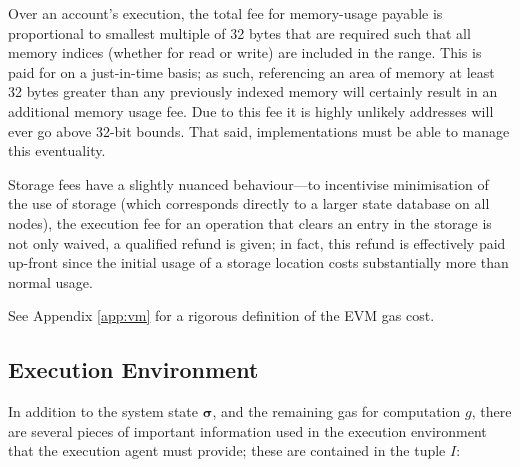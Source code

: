 \documentclass[9pt,oneside]{amsart}
\makeatletter
\newcommand{\linkdest}[1]{\Hy@raisedlink{\hypertarget{#1}{}}}
\makeatother
\begin{document}
\begin{multicols}{2}
Over an account's execution, the total fee for memory-usage payable is proportional to smallest multiple of 32 bytes that are required such that all memory indices (whether for read or write) are included in the range. This is paid for on a just-in-time basis; as such, referencing an area of memory at least 32 bytes greater than any previously indexed memory will certainly result in an additional memory usage fee. Due to this fee it is highly unlikely addresses will ever go above 32-bit bounds. That said, implementations must be able to manage this eventuality.

Storage fees have a slightly nuanced behaviour---to incentivise minimisation of the use of storage (which corresponds directly to a larger state database on all nodes), the execution fee for an operation that clears an entry in the storage is not only waived, a qualified refund is given; in fact, this refund is effectively paid up-front since the initial usage of a storage location costs substantially more than normal usage.

See Appendix \ref{app:vm} for a rigorous definition of the EVM gas cost.

\subsection{Execution Environment}\linkdest{exec_env}

In addition to the system state $\boldsymbol{\sigma}$, and the remaining gas for computation $g$, there are several pieces of important information used in the execution environment that the execution agent must provide; these are contained in the tuple $I$:


\end{multicols}
\end{document}
